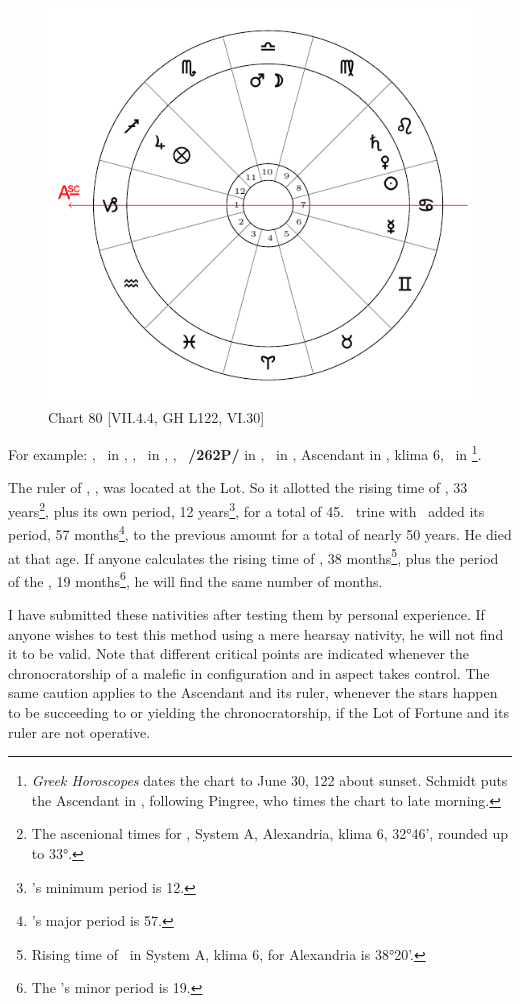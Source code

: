 \newpage
\begin{figure}
\centering
\vspace{-10pt}
\includegraphics[width=.68\textwidth]{charts/7_4_4}
\caption{Chart 80 [VII.4.4, GH L122, VI.30]}
\label{fig:chart80}
\end{figure} 

For example: \Sun, \Mercury\, in \Cancer, \Moon, \Mars\, in \Libra, \Saturn, \Venus\, \textbf{/262P/} in \Leo, \Jupiter\, in \Sagittarius, Ascendant in \Capricorn, klima 6, \Fortune\, in \Sagittarius\footnote{\textit{Greek Horoscopes} dates the chart to June 30, 122 about sunset. Schmidt puts the Ascendant in \Virgo, following Pingree, who times the chart to late morning.}. 

The ruler of \Sagittarius, \Jupiter, was located at the Lot. So it allotted the rising time of \Sagittarius, 33 years\footnote{The ascenional times for \Sagittarius, System A, Alexandria, klima 6, 32°46', rounded up to 33°.}, plus its own period, 12 years\footnote{\Jupiter's minimum period is 12.}, for a total of 45. \Saturn\, trine with \Jupiter\, added its period, 57 months\footnote{\Saturn's major period is 57.}, to the previous amount for a total of nearly 50 years. He died at that age. If anyone calculates the rising time of \Leo, 38 months\footnote{Rising time of \Leo\, in System A, klima 6, for Alexandria is 38°20'. }, plus the period of the \Sun, 19 months\footnote{The \Sun's minor period is 19.}, he will find the same number of months.

I have submitted these nativities after testing them by personal experience. If anyone wishes to test this method using a mere hearsay nativity, he will not find it to be valid. Note \mndl that different critical points
are indicated whenever the chronocratorship of a malefic in configuration and in aspect takes control. The same caution applies to the Ascendant and its ruler, whenever the stars happen to be succeeding to or yielding the chronocratorship, if the Lot of Fortune and its ruler are not operative.

